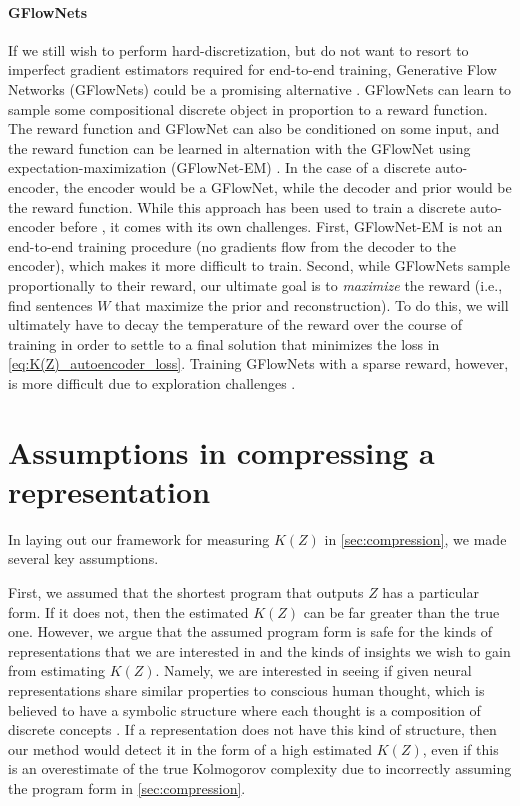 \documentclass{article} %
\begin{document}
\begin{appendices}
\paragraph{GFlowNets}

If we still wish to perform hard-discretization, but do not want to resort to imperfect gradient estimators required for end-to-end training, Generative Flow Networks (GFlowNets) could be a promising alternative \citep{bengio2021flow,bengio2023gflownet}. GFlowNets can learn to sample some compositional discrete object in proportion to a reward function. The reward function and GFlowNet can also be conditioned on some input, and the reward function can be learned in alternation with the GFlowNet using expectation-maximization (GFlowNet-EM) \citep{hu2023gflownet}. In the case of a discrete auto-encoder, the encoder would be a GFlowNet, while the decoder and prior would be the reward function. While this approach has been used to train a discrete auto-encoder before \citep{hu2023gflownet}, it comes with its own challenges. First, GFlowNet-EM is not an end-to-end training procedure (no gradients flow from the decoder to the encoder), which makes it more difficult to train. Second, while GFlowNets sample proportionally to their reward, our ultimate goal is to \emph{maximize} the reward (i.e., find sentences $W$ that maximize the prior and reconstruction). To do this, we will ultimately have to decay the temperature of the reward over the course of training in order to settle to a final solution that minimizes the loss in \cref{eq:K(Z)_autoencoder_loss}. Training GFlowNets with a sparse reward, however, is more difficult due to exploration challenges \citep{atanackovic2024investigating}.


\section{Assumptions in compressing a representation}
\label{sec:K(Z)_assumptions}

In laying out our framework for measuring $K(Z)$ in \cref{sec:compression}, we made several key assumptions.

First, we assumed that the shortest program that outputs $Z$ has a particular form. If it does not, then the estimated $K(Z)$ can be far greater than the true one. However, we argue that the assumed program form is safe for the kinds of representations that we are interested in and the kinds of insights we wish to gain from estimating $K(Z)$. Namely, we are interested in seeing if given neural representations share similar properties to conscious human thought, which is believed to have a symbolic structure where each thought is a composition of discrete concepts \citep{fodor1975language}. If a representation does not have this kind of structure, then our method would detect it in the form of a high estimated $K(Z)$, even if this is an overestimate of the true Kolmogorov complexity due to incorrectly assuming the program form in \cref{sec:compression}.


\end{appendices}
\end{document}
